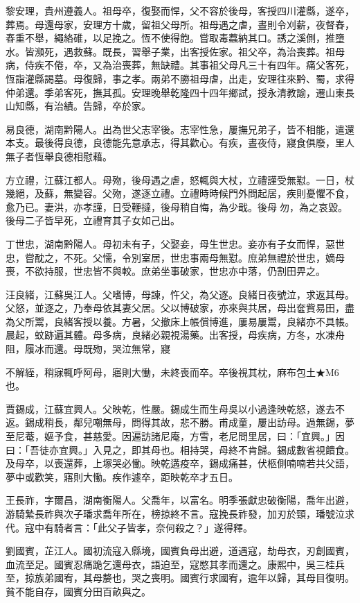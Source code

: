 \begin{pinyinscope}
黎安理，貴州遵義人。祖母卒，復娶而悍，父不容於後母，客授四川灌縣，遂卒，葬焉。母還母家，安理方十歲，留祖父母所。祖母遇之虐，晝則令刈薪，夜督舂，舂重不舉，繩絡碓，以足挽之。恆不使得飽。嘗取毒蠚納其口。誘之溪側，推墮水。皆瀕死，遇救蘇。既長，習舉子業，出客授佐家。祖父卒，為治喪葬。祖母病，侍疾不倦，卒，又為治喪葬，無缺禮。其事祖父母凡三十有四年。痛父客死，恆詣灌縣謁墓。母復歸，事之孝。兩弟不勝祖母虐，出走，安理往來黔、蜀，求得仲弟還。季弟客死，撫其孤。安理晚舉乾隆四十四年鄉試，授永清教諭，遷山東長山知縣，有治績。告歸，卒於家。

易良德，湖南黔陽人。出為世父志宰後。志宰性急，屢撫兄弟子，皆不相能，遣還本支。最後得良德，良德能先意承志，得其歡心。有疾，晝夜侍，寢食俱廢，里人無子者恆舉良德相慰藉。

方立禮，江蘇江都人。母歾，後母遇之虐，怒輒與大杖，立禮謹受無懟。一日，杖幾絕，及蘇，無變容。父歾，遂逐立禮。立禮時時候門外問起居，疾則憂懼不食，愈乃已。妻洪，亦孝謹，日受鞭撻，後母稍自悔，為少戢。後母勿，為之哀毀。後母二子皆早死，立禮育其子女如己出。

丁世忠，湖南黔陽人。母初未有子，父娶妾，母生世忠。妾亦有子女而悍，惡世忠，嘗酖之，不死。父懦，令別室居，世忠事兩母無懟。庶弟無禮於世忠，嫡母喪，不欲持服，世忠皆不與較。庶弟坐事破家，世忠亦中落，仍割田畀之。

汪良緒，江蘇吳江人。父嗜博，母諫，忤父，為父逐。良緒日夜號泣，求返其母。父怒，並逐之，乃奉母依其妻父居。父以博破家，亦來與共居，母出奩貲易田，盡為父所鬻，良緒客授以養。方暑，父撤床上帳償博進，屢易屢鬻，良緒亦不具帳。晨起，蚊跡遍其體。母多病，良緒必親視湯藥。出客授，母疾病，方冬，水凍舟阻，履冰而還。母既歾，哭泣無常，寢

不解絰，稍寐輒呼阿母，寤則大慟，未終喪而卒。卒後視其枕，麻布包土★M6也。

賈錫成，江蘇宜興人。父映乾，性嚴。錫成生而生母吳以小過逢映乾怒，遂去不返。錫成稍長，鄰兒嘲無母，問得其故，悲不勝。甫成童，屢出訪母。過無錫，夢至尼菴，嫗予食，甚慈愛。因遍訪諸尼庵，方雪，老尼問里居，曰：「宜興。」因曰：「吾徒亦宜興。」入見之，即其母也。相持哭，母終不肯歸。錫成數省視饋食。及母卒，以喪還葬，上塚哭必慟。映乾遘疫卒，錫成痛甚，伏柩側喃喃若共父語，夢中或歡笑，寤則大慟。疾作遽卒，距映乾卒才五日。

王長祚，字爾昌，湖南衡陽人。父喬年，以富名。明季張獻忠破衡陽，喬年出避，游騎縶長祚與次子璠求喬年所在，榜掠終不言。寇挽長祚發，加刃於頸，璠號泣求代。寇中有騎者言：「此父子皆孝，奈何殺之？」遂得釋。

劉國賓，芷江人。國初流寇入縣境，國賓負母出避，道遇寇，劫母衣，刃創國賓，血流至足。國賓忍痛跪乞還母衣，語迫至，寇愍其孝而還之。康熙中，吳三桂兵至，掠族弟國宥，其母嫠也，哭之喪明。國賓行求國宥，逾年以歸，其母目復明。貧不能自存，國賓分田百畝與之。


\end{pinyinscope}
